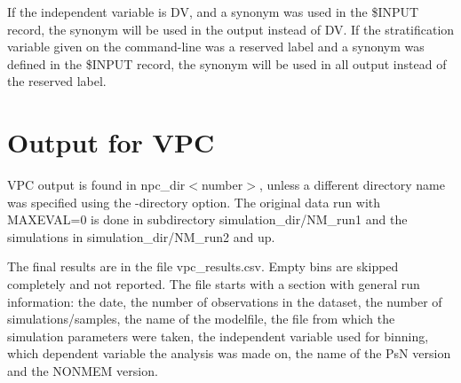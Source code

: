 If the independent variable is DV, and a synonym was used in the \$INPUT record, the synonym will be used in the output instead of DV.  If  the stratification variable given on the command-line was a reserved label and a synonym was defined in the \$INPUT record, the synonym will be used in all output instead of the reserved label.

\section{Output for VPC}
VPC output is found in npc\_dir$<$number$>$, unless a different directory name was specified using the -directory option. The original data run with MAXEVAL=0 is done in subdirectory simulation\_dir/NM\_run1 and the simulations in simulation\_dir/NM\_run2 and up. 

The final results are in the file vpc\_results.csv. Empty bins are skipped completely and not reported. The file starts with a section with general run information: the date, the number of observations in the dataset, the number of simulations/samples, the name of the modelfile, the file from which the simulation parameters were taken, the independent variable used for binning, which dependent variable the analysis was made on, the name of the PsN version and the NONMEM version. 

